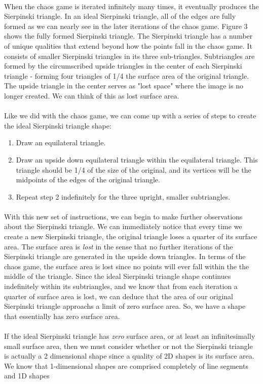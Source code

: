 \documentclass{article}
\begin{document}
\paragraph{}
When the chaos game is iterated infinitely many times, it eventually produces the Sierpinski triangle. In an ideal Sierpinski triangle, all of the edges are fully formed as we can nearly see in the later iterations of the chaos game. Figure 3 shows the fully formed Sierpinski triangle. The Sierpinski triangle has a number of unique qualities that extend beyond how the points fall in the chaos game. It consists of smaller Sierpinski triangles in its three sub-triangles. Subtriangles are formed by the circumscribed upside triangles in the center of each Sierpinski triangle - forming four triangles of 1/4 the surface area of the original triangle. The upside triangle in the center serves as "lost space" where the image is no longer created. We can think of this as lost surface area.
\paragraph{}
Like we did with the chaos game, we can come up with a series of steps to create the ideal Sierpinski triangle shape:
\begin{enumerate}
    \item Draw an equilateral triangle.
    \item Draw an upside down equilateral triangle within the equilateral triangle. This triangle should be 1/4 of the size of the original, and its vertices will be the midpoints of the edges of the original triangle.
    \item Repeat step 2 indefinitely for the three upright, smaller subtriangles.
\end{enumerate}
\paragraph{}
With this new set of instructions, we can begin to make further observations about the Sierpinski triangle. We can immediately notice that every time we create a new Sierpinski triangle, the original triangle loses a quarter of its surface area. The surface area is \textit{lost} in the sense that no further iterations of the Sierpinski triangle are generated in the upside down triangles. In terms of the chaos game, the surface area is lost since no points will ever fall within the the middle of the triangle. Since the ideal Sierpinski triangle shape continues indefinitely within its subtriangles, and we know that from each iteration a quarter of surface area is lost, we can deduce that the area of our original Sierpinski triangle approachs a limit of zero surface area. So, we have a shape that essentially has zero surface area.
\paragraph{}
If the ideal Sierpinski triangle has \textit{zero} surface area, or at least an infinitesimally small surface area, then we must consider whether or not the Sierpinski triangle is actually a 2 dimensional shape since a quality of 2D shapes is its surface area. We know that 1-dimensional shapes are comprised completely of line segments and 1D shapes
\end{document}
